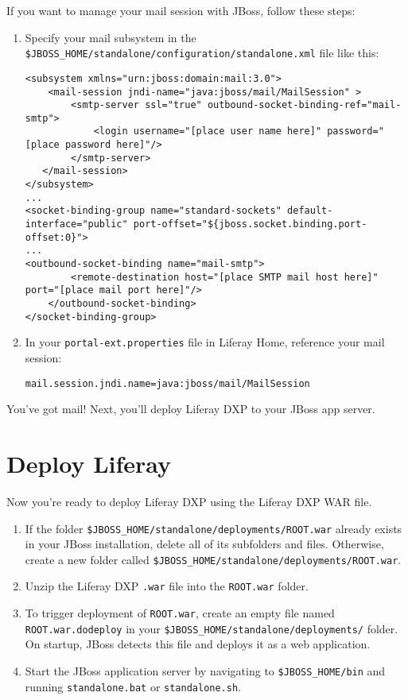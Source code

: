 If you want to manage your mail session with JBoss, follow these steps:

\begin{enumerate}
\def\labelenumi{\arabic{enumi}.}
\item
  Specify your mail subsystem in the
  \texttt{\$JBOSS\_HOME/standalone/configuration/standalone.xml} file
  like this:

\begin{verbatim}
<subsystem xmlns="urn:jboss:domain:mail:3.0">
    <mail-session jndi-name="java:jboss/mail/MailSession" >
        <smtp-server ssl="true" outbound-socket-binding-ref="mail-smtp">
            <login username="[place user name here]" password="[place password here]"/>
        </smtp-server>
   </mail-session>
</subsystem>
...
<socket-binding-group name="standard-sockets" default-interface="public" port-offset="${jboss.socket.binding.port-offset:0}">
...
<outbound-socket-binding name="mail-smtp">
        <remote-destination host="[place SMTP mail host here]" port="[place mail port here]"/>
    </outbound-socket-binding>
</socket-binding-group>
\end{verbatim}
\item
  In your \texttt{portal-ext.properties} file in Liferay Home, reference
  your mail session:

\begin{verbatim}
mail.session.jndi.name=java:jboss/mail/MailSession
\end{verbatim}
\end{enumerate}

You've got mail! Next, you'll deploy Liferay DXP to your JBoss app
server.

\section{Deploy Liferay}\label{deploy-liferay}

Now you're ready to deploy Liferay DXP using the Liferay DXP WAR file.

\begin{enumerate}
\def\labelenumi{\arabic{enumi}.}
\item
  If the folder \texttt{\$JBOSS\_HOME/standalone/deployments/ROOT.war}
  already exists in your JBoss installation, delete all of its
  subfolders and files. Otherwise, create a new folder called
  \texttt{\$JBOSS\_HOME/standalone/deployments/ROOT.war}.
\item
  Unzip the Liferay DXP \texttt{.war} file into the \texttt{ROOT.war}
  folder.
\item
  To trigger deployment of \texttt{ROOT.war}, create an empty file named
  \texttt{ROOT.war.dodeploy} in your
  \texttt{\$JBOSS\_HOME/standalone/deployments/} folder. On startup,
  JBoss detects this file and deploys it as a web application.
\item
  Start the JBoss application server by navigating to
  \texttt{\$JBOSS\_HOME/bin} and running \texttt{standalone.bat} or
  \texttt{standalone.sh}.
\end{enumerate}

